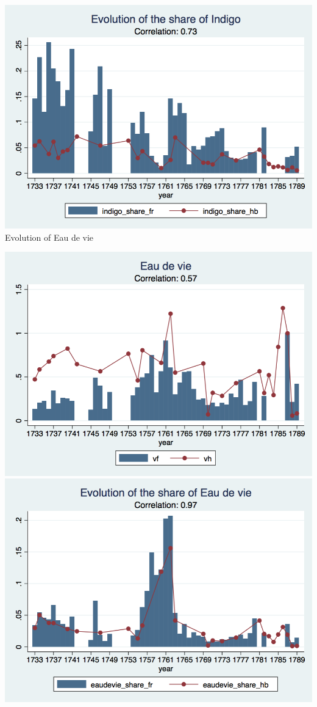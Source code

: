\documentclass[12pt,a4paper,titlepage,english]{article}
\begin{document}
\includegraphics[scale=.28]{indigo_share_long.png}\\
\caption{Evolution of Eau de vie}
\includegraphics[scale=.28]{eaudevie_long.png}
\includegraphics[scale=.28]{eaudevie_share_long.png}\\
\end{document}

